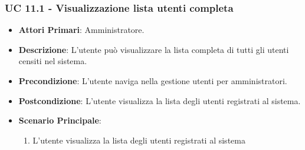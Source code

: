 			\subsubsection{UC 11.1 - Visualizzazione lista utenti completa}
			\begin{itemize}
				\item \textbf{Attori Primari}: Amministratore.
				\item \textbf{Descrizione}: L'utente può visualizzare la lista completa di tutti gli utenti censiti nel sistema.
				\item \textbf{Precondizione}: L'utente naviga nella gestione utenti per amministratori.
				\item \textbf{Postcondizione}: L'utente visualizza la lista degli utenti registrati al sistema.
				\item \textbf{Scenario Principale}:
				\begin{enumerate}
					\item{L'utente visualizza la lista degli utenti registrati al sistema}
				\end{enumerate}	
			\end{itemize}
			
